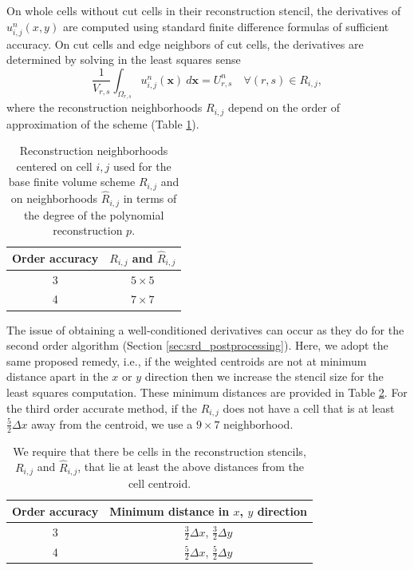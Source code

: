On whole cells without cut cells in their reconstruction stencil, the derivatives of $u^n_{i,j}(x,y)$ are computed using standard finite difference formulas of sufficient accuracy.
On cut cells and edge neighbors of cut cells, the derivatives are determined by solving in the least squares sense
\begin{equation}\label{eq:ls_base}
\frac{1}{V_{r,s}}\int_{\Omega_{r,s}} u^n_{i,j}(\mathbf{x})~d\mathbf{x} = U^n_{r,s} \quad \forall (r,s) \in R_{i,j},
\end{equation}
where the reconstruction neighborhoods $R_{i,j}$ depend on the order of approximation of the scheme (Table \ref{tab:reconneigh}).
\begin{table}
	\centering
	\begin{tabular}{|c|c|}
		\hline 
		Order accuracy & $R_{i,j}$ and $\hat R_{i,j}$ \\
		\hline
		3 & $5 \times 5$ \\
		\hline
		4 & $7 \times 7$ \\
		\hline
	\end{tabular} 
	\caption{Reconstruction neighborhoods centered on cell $i,j$ used for the base finite volume scheme $R_{i,j}$ and on neighborhoods $\widehat{R}_{i,j}$ in terms of the degree of the polynomial reconstruction $p$.  
} \label{tab:reconneigh}
\end{table}

The issue of obtaining a well-conditioned derivatives can occur as they do for the second order algorithm (Section \ref{sec:srd_postprocessing}).  Here, we adopt the same proposed remedy, i.e., if the weighted centroids are not at minimum distance apart in the $x$ or $y$ direction then we increase the stencil size for the least squares computation.  These minimum distances are provided in Table \ref{tab:mindist}.  For the third order accurate method, if the $ R_{i,j}$ does not have a cell that is at least $\frac{5}{2}\Delta x$ away from the centroid, we use a $9 \times 7$ neighborhood.
\begin{table}
	\centering
	\begin{tabular}{|c|c|}
		\hline 
		Order accuracy & Minimum distance in $x$, $y$ direction \\ 
		\hline 
		3 & $\frac{3}{2}\Delta x$, $\frac{3}{2}\Delta y$ \\ 
		\hline
		4 & $\frac{5}{2}\Delta x$, $\frac{5}{2}\Delta y$ \\ 
		\hline 
	\end{tabular}  
	\caption{We require that there be cells in the reconstruction stencils, $R_{i,j}$ and $\widehat R_{i,j}$, that lie at least the above distances from the cell centroid.} \label{tab:mindist}
\end{table}

